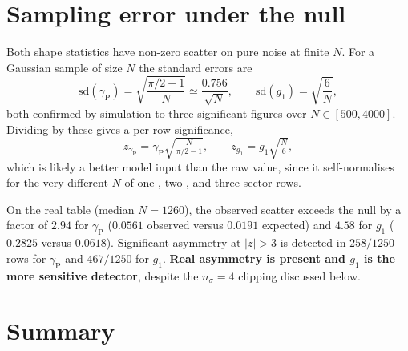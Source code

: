 \documentclass[11pt]{article}
\newcommand{\gp}{\gamma_{\mathrm{P}}}
\begin{document}
\section{Sampling error under the null}

Both shape statistics have non-zero scatter on pure noise at finite $N$. For a
Gaussian sample of size $N$ the standard errors are
%
\begin{equation}
  \mathrm{sd}(\gp) = \sqrt{\frac{\pi/2 - 1}{N}} \simeq \frac{0.756}{\sqrt{N}},
  \qquad
  \mathrm{sd}(g_1) = \sqrt{\frac{6}{N}} ,
  \label{eq:nullse}
\end{equation}
%
both confirmed by simulation to three significant figures over
$N \in [500, 4000]$. Dividing by these gives a per-row significance,
%
\begin{equation}
  z_{\gp} = \gp \sqrt{\tfrac{N}{\pi/2-1}},
  \qquad
  z_{g_1} = g_1 \sqrt{\tfrac{N}{6}},
  \label{eq:zscores}
\end{equation}
%
which is likely a better model input than the raw value, since it self-normalises
for the very different $N$ of one-, two-, and three-sector rows.

On the real table (median $N = 1260$), the observed scatter exceeds the null by a
factor of $2.94$ for $\gp$ ($0.0561$ observed versus $0.0191$ expected) and
$4.58$ for $g_1$ ($0.2825$ versus $0.0618$). Significant asymmetry at
$|z| > 3$ is detected in $258/1250$ rows for $\gp$ and $467/1250$ for $g_1$.
\textbf{Real asymmetry is present and $g_1$ is the more sensitive detector},
despite the $n_\sigma = 4$ clipping discussed below.

\section{Summary}
\end{document}
